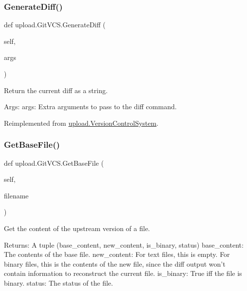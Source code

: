 \mbox{\label{classupload_1_1GitVCS_a3ebfc01cebc9b585706ad3f4389a8833}} 
\subsubsection{\texorpdfstring{GenerateDiff()}{GenerateDiff()}\hspace{0.1cm}{\footnotesize\ttfamily [2/2]}}
{\footnotesize\ttfamily def upload.\+Git\+V\+C\+S.\+Generate\+Diff (\begin{DoxyParamCaption}\item[{}]{self,  }\item[{}]{args }\end{DoxyParamCaption})}

\begin{DoxyVerb}Return the current diff as a string.

Args:
  args: Extra arguments to pass to the diff command.
\end{DoxyVerb}
 

Reimplemented from \mbox{\hyperlink{classupload_1_1VersionControlSystem_aa5eb260c96e7016dab36b5fc136c9f49}{upload.\+Version\+Control\+System}}.

\mbox{\label{classupload_1_1GitVCS_a70ddb65a6b512b8cb8cc4affa37ff9b4}} 
\subsubsection{\texorpdfstring{GetBaseFile()}{GetBaseFile()}\hspace{0.1cm}{\footnotesize\ttfamily [1/2]}}
{\footnotesize\ttfamily def upload.\+Git\+V\+C\+S.\+Get\+Base\+File (\begin{DoxyParamCaption}\item[{}]{self,  }\item[{}]{filename }\end{DoxyParamCaption})}

\begin{DoxyVerb}Get the content of the upstream version of a file.

Returns:
  A tuple (base_content, new_content, is_binary, status)
base_content: The contents of the base file.
new_content: For text files, this is empty.  For binary files, this is
  the contents of the new file, since the diff output won't contain
  information to reconstruct the current file.
is_binary: True iff the file is binary.
status: The status of the file.
\end{DoxyVerb}
 

